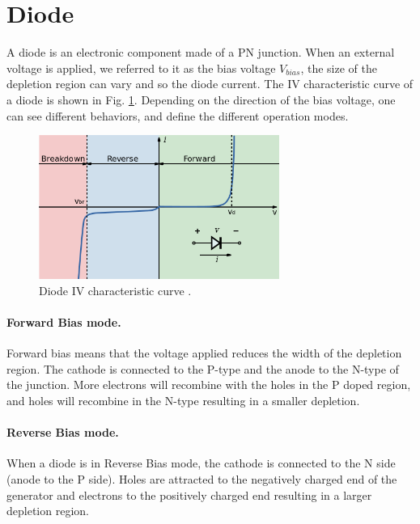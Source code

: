 \section{Diode}
\label{sec:background:Basic principles:Diodes and photo-diodes}
A diode is an electronic component made of a PN junction. 
When an external voltage is applied, we referred to it as the bias voltage $V_{bias}$, the size of the depletion region can vary and so the diode current. The IV characteristic curve of a diode is shown in Fig. \ref{fig:chapter02:Diodes and photo-diodes: iv curve}. Depending on the direction of the bias voltage, one can see different behaviors, and define the different operation modes. 
\begin{figure}[htbp]
 \centering
\includegraphics[width=0.7\textwidth]{gfx/documentation/Diode_IV_curve.png}
 \caption{Diode IV characteristic curve \cite{DiodeCurve}.}
 \label{fig:chapter02:Diodes and photo-diodes: iv curve}
\end{figure}


\paragraph{Forward Bias mode.} Forward bias means that the voltage applied reduces the width of the depletion region. The cathode is connected to the P-type and the anode to the N-type of the junction. More electrons will recombine with the holes in the P doped region, and holes will recombine in the N-type resulting in a smaller depletion.

\paragraph{Reverse Bias mode.} When a diode is in Reverse Bias mode, the cathode is connected to the N side (anode to the P side). Holes are attracted to the negatively charged end of the generator and electrons to the positively charged end resulting in a larger depletion region. 

